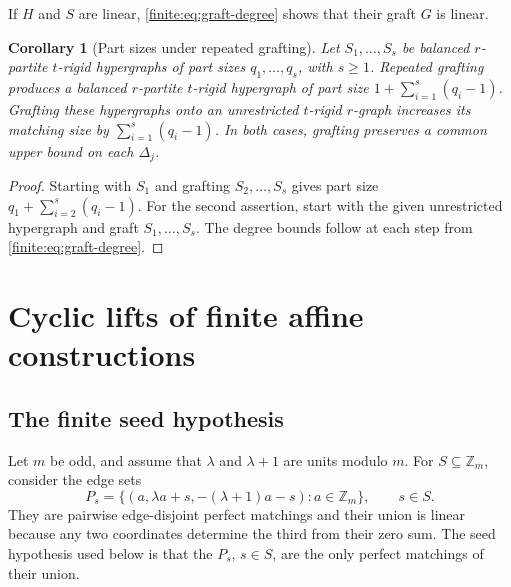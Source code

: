\documentclass[10pt]{article}
\numberwithin{equation}{section}
\newtheorem{corollary}[corollary]{Corollary}\aliascntresetthe{corollary}
\begin{document}
If $H$ and $S$ are linear, \cref{finite:eq:graft-degree} shows that their graft $G$ is linear.

\begin{corollary}[Part sizes under repeated grafting]\label{finite:cor:graft-semigroup}
Let $S_1,\ldots,S_s$ be balanced $r$-partite $t$-rigid hypergraphs of part sizes $q_1,\ldots,q_s$, with $s\ge1$. Repeated grafting produces a balanced $r$-partite $t$-rigid hypergraph of part size $1+\sum_{i=1}^s(q_i-1)$. Grafting these hypergraphs onto an unrestricted $t$-rigid $r$-graph increases its matching size by $\sum_{i=1}^s(q_i-1)$. In both cases, grafting preserves a common upper bound on each $\Delta_j$.
\end{corollary}
\begin{proof}
Starting with $S_1$ and grafting $S_2,\ldots,S_s$ gives part size $q_1+\sum_{i=2}^s(q_i-1)$. For the second assertion, start with the given unrestricted hypergraph and graft $S_1,\ldots,S_s$. The degree bounds follow at each step from \cref{finite:eq:graft-degree}.
\end{proof}
\section{Cyclic lifts of finite affine constructions}\label{finite:sec:modular-lifts}
\subsection{The finite seed hypothesis}\label{finite:subsec:affine-seeds}
Let $m$ be odd, and assume that $\lambda$ and $\lambda+1$ are units
modulo $m$. For $S\subseteq\mathbb Z_m$, consider the edge sets
\begin{equation}\label{finite:eq:single-sum}
 P_s=\{(a,\lambda a+s,-(\lambda+1)a-s):a\in\mathbb Z_m\},
 \qquad s\in S.
\end{equation}
They are pairwise edge-disjoint perfect matchings and their union is
linear because any two coordinates determine the third from their zero sum.
The seed hypothesis used below is that the $P_s$, $s\in S$, are the
only perfect matchings of their union.
\end{document}

